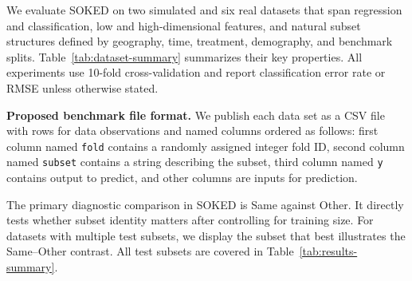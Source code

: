 \documentclass{article}
\begin{document}
We evaluate SOKED on two simulated and six real datasets that span regression and classification, low and high-dimensional features, and natural subset structures defined by geography, time, treatment, demography, and benchmark splits.
Table~\ref{tab:dataset-summary} summarizes their key properties.
All experiments use 10-fold cross-validation and report classification error rate or RMSE unless otherwise stated.

\textbf{Proposed benchmark file format.}
We publish each data set as a CSV file with rows for data observations and named columns ordered as follows: first column named \texttt{fold} contains a randomly assigned integer fold ID, second column named \texttt{subset} contains a string describing the subset, third column named \texttt{y} contains output to predict, and other columns are inputs for prediction.

The primary diagnostic comparison in SOKED is Same against Other. 
It directly tests whether subset identity matters after controlling for training size.
For datasets with multiple test subsets, we display the subset that best illustrates the Same--Other contrast. 
All test subsets are covered in Table~\ref{tab:results-summary}.
\end{document}

